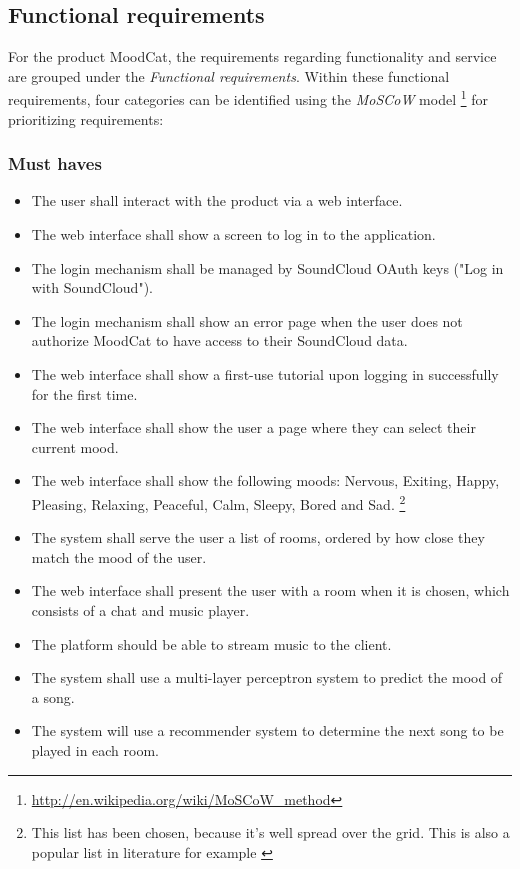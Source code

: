 
\subsection{Functional requirements}
For the product MoodCat, the requirements regarding functionality and service are grouped under the \emph{Functional requirements}.
Within these functional requirements, four categories can be identified using the \emph{MoSCoW} model \footnote{\url{http://en.wikipedia.org/wiki/MoSCoW_method}} for prioritizing requirements:

\subsubsection{Must haves}
\begin{itemize}
\item The user shall interact with the product via a web interface.

\item The web interface shall show a screen to log in to the application.

\item The login mechanism shall be managed by SoundCloud OAuth keys ("Log in with SoundCloud").

\item The login mechanism shall show an error page when the user does not authorize MoodCat to have access to their SoundCloud data.

\item The web interface shall show a first-use tutorial upon logging in successfully for the first time.

\item The web interface shall show the user a page where they can select their current mood.

\item The web interface shall show the following moods:
 Nervous, Exiting, Happy, Pleasing, Relaxing, Peaceful, Calm, Sleepy, Bored and Sad. \footnote{This list has been chosen, because it's well spread over the grid. This is also a popular list in literature for example \cite{Book}}

\item The system shall serve the user a list of rooms, ordered by how close they match the mood of the user.

\item The web interface shall present the user with a room when it is chosen, which consists of a chat and music player.
	
\item The platform should be able to stream music to the client.

\item The system shall use a multi-layer perceptron system to predict the mood of a song.

\item The system will use a recommender system to determine the next song to be played in each room.

\end{itemize}

